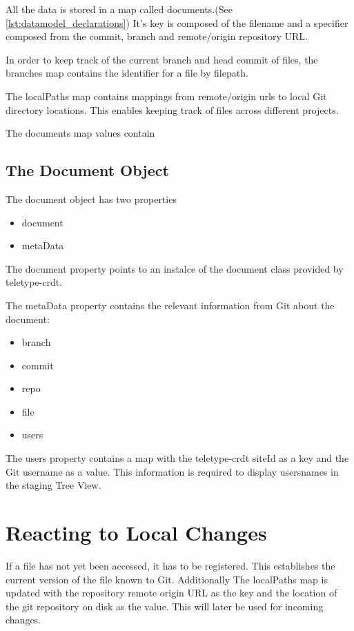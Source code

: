 All the data is stored in a map called documents.(See \autoref{lst:datamodel_declarations})
It's key is composed of the filename and a specifier composed from the commit, branch and remote/origin repository URL.

In order to keep track of the current branch and head commit of files, the branches map contains the identifier for a file by filepath.

The localPaths map contains mappings from remote/origin urls to local Git directory locations.
This enables keeping track of files across different projects.


The documents map values contain

\subsection{The Document Object}

The document object has two properties

\begin{itemize}
    \item document
    \item metaData
\end{itemize}

The document property points to an instalce of the document class provided by teletype-crdt.

The metaData property contains the relevant information from Git about the document:
\begin{itemize}
    \item branch
    \item commit
    \item repo
    \item file
    \item users
\end{itemize}

The users property contains a map with the teletype-crdt siteId as a key and the Git username as a value.
This information is required to display usersnames in the staging Tree View.

\section{Reacting to Local Changes}
If a file has not yet been accessed, it has to be registered. This establishes the current version of the file known to Git. Additionally The localPaths map is updated with the repository remote origin URL as the key and the location of the git repository on disk as the value. This will later be used for incoming changes.

